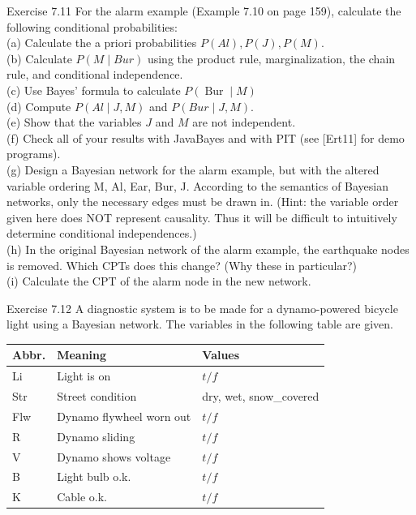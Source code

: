 \documentclass[10pt]{article}
\begin{document}
Exercise 7.11 For the alarm example (Example 7.10 on page 159), calculate the following conditional probabilities:\\
(a) Calculate the a priori probabilities $P(A l), P(J), P(M)$.\\
(b) Calculate $P(M \mid B u r)$ using the product rule, marginalization, the chain rule, and conditional independence.\\
(c) Use Bayes' formula to calculate $P(\operatorname{Bur} \mid M)$\\
(d) Compute $P(A l \mid J, M)$ and $P(B u r \mid J, M)$.\\
(e) Show that the variables $J$ and $M$ are not independent.\\[0pt]
(f) Check all of your results with JavaBayes and with PIT (see [Ert11] for demo programs).\\
(g) Design a Bayesian network for the alarm example, but with the altered variable ordering M, Al, Ear, Bur, J. According to the semantics of Bayesian networks, only the necessary edges must be drawn in. (Hint: the variable order given here does NOT represent causality. Thus it will be difficult to intuitively determine conditional independences.)\\
(h) In the original Bayesian network of the alarm example, the earthquake nodes is removed. Which CPTs does this change? (Why these in particular?)\\
(i) Calculate the CPT of the alarm node in the new network.

Exercise 7.12 A diagnostic system is to be made for a dynamo-powered bicycle light using a Bayesian network. The variables in the following table are given.

\begin{center}
\begin{tabular}{|l|l|l|}
\hline
Abbr. & Meaning & Values \\
\hline
Li & Light is on & $t / f$ \\
\hline
Str & Street condition & dry, wet, snow\_covered \\
\hline
Flw & Dynamo flywheel worn out & $t / f$ \\
\hline
R & Dynamo sliding & $t / f$ \\
\hline
V & Dynamo shows voltage & $t / f$ \\
\hline
B & Light bulb o.k. & $t / f$ \\
\hline
K & Cable o.k. & $t / f$ \\
\hline
\end{tabular}
\end{center}
\end{document}
